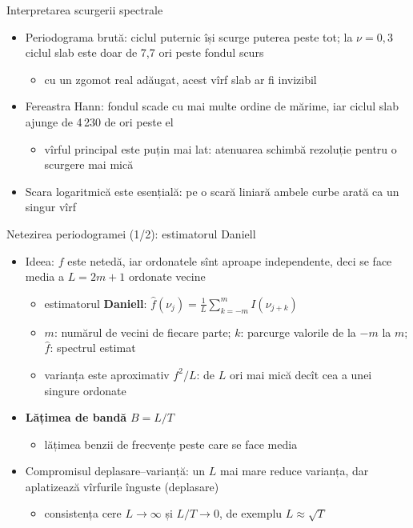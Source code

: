 \begin{frame}{Interpretarea scurgerii spectrale}
\itemsize{\small}
\begin{itemize}
    \item Periodograma brută: ciclul puternic își scurge puterea peste tot; la $\nu = 0{,}3$ ciclul slab este doar de 7{,}7 ori peste fondul scurs
    \begin{itemize}
        \item cu un zgomot real adăugat, acest vîrf slab ar fi invizibil
    \end{itemize}
    \item Fereastra Hann: fondul scade cu mai multe ordine de mărime, iar ciclul slab ajunge de 4\,230 de ori peste el
    \begin{itemize}
        \item vîrful principal este puțin mai lat: atenuarea schimbă rezoluție pentru o scurgere mai mică
    \end{itemize}
    \item Scara logaritmică este esențială: pe o scară liniară ambele curbe arată ca un singur vîrf
\end{itemize}
\end{frame}

\begin{frame}{Netezirea periodogramei (1/2): estimatorul Daniell}
\itemsize{\footnotesize}
\begin{itemize}
    \item Ideea: $f$ este netedă, iar ordonatele sînt aproape independente, deci se face media a $L = 2m + 1$ ordonate vecine
    \begin{itemize}
        \item estimatorul \textbf{Daniell}: $\hat f(\nu_j) = \frac{1}{L}\sum_{k=-m}^{m} I(\nu_{j+k})$
        \item $m$: numărul de vecini de fiecare parte; $k$: parcurge valorile de la $-m$ la $m$; $\hat f$: spectrul estimat
        \item varianța este aproximativ $f^2/L$: de $L$ ori mai mică decît cea a unei singure ordonate
    \end{itemize}
    \item \textbf{Lățimea de bandă} $B = L/T$
    \begin{itemize}
        \item lățimea benzii de frecvențe peste care se face media
    \end{itemize}
    \item Compromisul deplasare--varianță: un $L$ mai mare reduce varianța, dar aplatizează vîrfurile înguste (deplasare)
    \begin{itemize}
        \item consistența cere $L \to \infty$ și $L/T \to 0$, de exemplu $L \approx \sqrt T$
    \end{itemize}
\end{itemize}
\end{frame}


